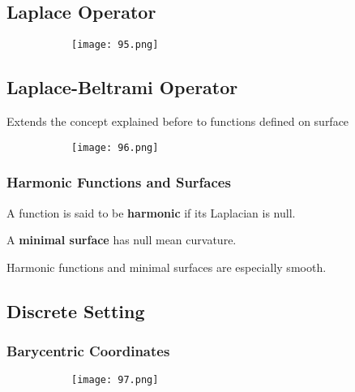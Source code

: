 \documentclass{article}
\begin{document}
\vspace{30mm}

\subsection{Laplace Operator}

    \begin{figure}[ht!]
  \centering
  \begin{subfigure}[b]{0.9\linewidth}
    \texttt{[image: 95.png]}
  \end{subfigure}
\end{figure}


\subsection{Laplace-Beltrami Operator}

Extends the concept explained before to functions defined on surface

    \begin{figure}[ht!]
  \centering
  \begin{subfigure}[b]{0.7\linewidth}
    \texttt{[image: 96.png]}
  \end{subfigure}
\end{figure}

\subsubsection{Harmonic Functions and Surfaces}

A function is said to be \textbf{harmonic} if its Laplacian is null.

A \textbf{minimal surface} has null mean curvature.

Harmonic functions and minimal surfaces are especially smooth.

\vspace{30mm}

\subsection{Discrete Setting}

\subsubsection{Barycentric Coordinates}


    \begin{figure}[ht!]
  \centering
  \begin{subfigure}[b]{0.7\linewidth}
    \texttt{[image: 97.png]}
  \end{subfigure}
\end{figure}
\end{document}
